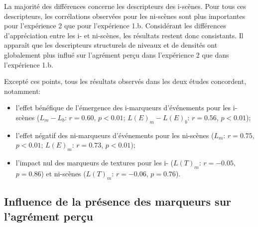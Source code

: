 La majorité des différences concerne les descripteurs des i-scènes. Pour tous ces descripteurs, les corrélations observées pour les ni-scènes sont plus importantes pour l'expérience 2 que pour l'expérience 1.b. Considérant les différences d'appréciation entre les i- et ni-scènes, les résultats restent donc consistants. Il apparaît que les descripteurs structurels de niveaux et de densités ont globalement plus influé sur l'agrément perçu dans l'expérience 2 que dans l'expérience 1.b.

Excepté ces points, tous les résultats observés dans les deux études concordent, notamment:

\begin{itemize}
\item l'effet bénéfique de l'émergence des i-marqueurs d'événements pour les i-scènes ($L_m-L_b$: $r=0.60$, $p<0.01$; $L(E)_m-L(E)_b$: $r=0.56$, $p<0.01$);
\item l'effet négatif des ni-marqueurs d'événements pour les ni-scènes ($L_m$: $r=0.75$, $p<0.01$; $L(E)_m$: $r=0.73$, $p<0.01$);
\item l'impact nul des marqueurs de textures pour les i- ($L(T)_m$: $r=-0.05$, $p=0.86$) et ni-scènes ($L(T)_m$: $r=-0.06$, $p=0.76$).
\end{itemize}


\subsection{Influence de la présence des marqueurs sur l'agrément perçu}
\label{sec:ch5_Asujet}

